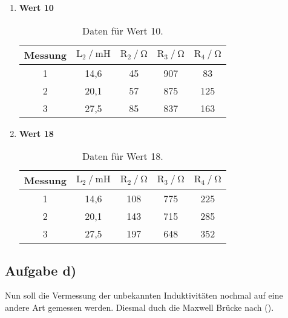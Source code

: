 \begin{enumerate}
\item \textbf{Wert 10}

\begin{table}
\centering
\begin{tabular}{c c c c c}
\toprule
{Messung} & {$\text{L}_2 \mathbin{/} \si{\milli\henry}$} &{$ \text{R}_2 \mathbin{/} \si{\ohm} $} & {$ \text{R}_3 \mathbin{/} \si{\ohm} $} & {$ \text{R}_4 \mathbin{/} \si{\ohm} $} \\
\midrule
1 & 14,6 & 45 & 907 & 83 \\
2 & 20,1 & 57 & 875 & 125 \\
3 & 27,5 & 85 & 837 & 163 \\
\bottomrule
\end{tabular}
\caption{Daten für Wert 10.}
\label{tab:ac10}
\end{table}



\item \textbf{Wert 18}

\begin{table}
\centering
\begin{tabular}{c c c c c}
\toprule
{Messung} & {$\text{L}_2 \mathbin{/} \si{\milli\henry}$} &{$ \text{R}_2 \mathbin{/} \si{\ohm} $} & {$ \text{R}_3 \mathbin{/} \si{\ohm} $} & {$ \text{R}_4 \mathbin{/} \si{\ohm} $} \\
\midrule
1 & 14,6 & 108 & 775 & 225 \\
2 & 20,1 & 143 & 715 & 285 \\
3 & 27,5 & 197 & 648 & 352 \\
\bottomrule
\end{tabular}
\caption{Daten für Wert 18.}
\label{tab:ac18}
\end{table}

\end{enumerate}

\newpage
\subsection{Aufgabe d)}

Nun soll die Vermessung der unbekannten Induktivitäten nochmal auf eine andere Art gemessen werden.
Diesmal duch die Maxwell Brücke nach (). 

